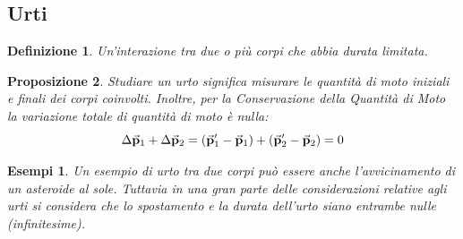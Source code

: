 \documentclass{article}
\newtheorem{defn}{Definizione}[section]
\newtheorem{prop}[defn]{Proposizione}
\newtheorem{example}{Esempi}[subsection]
\newcommand{\p}{\va{p}}
\begin{document}
\subsection{Urti}
\begin{defn}
Un'interazione tra due o più corpi che abbia durata limitata.
\end{defn}

\begin{prop}
Studiare un urto significa misurare le quantità di moto iniziali e finali dei corpi coinvolti. Inoltre, per la Conservazione della Quantità di Moto la variazione totale di quantità di moto è nulla:
\[\Delta\p_1+\Delta\p_2=(\p'_1-\p_1)+(\p'_2-\p_2)=0\]
\end{prop}

\begin{example}
Un esempio di urto tra due corpi può essere anche l'avvicinamento di un asteroide al sole. Tuttavia in una gran parte delle considerazioni relative agli urti si considera che lo spostamento e la durata dell'urto siano entrambe nulle (infinitesime).
\end{example}
\end{document}
